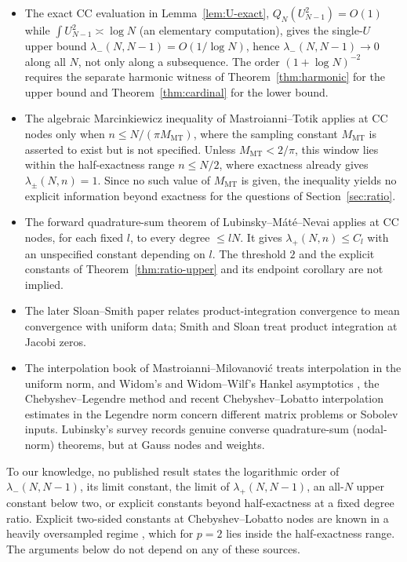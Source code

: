 \documentclass{siamart251216}
\newcommand{\Pn}{\Pi}
\begin{document}
\begin{itemize}
covers the CC nodes for even $N$ on $\Pn_N$. For Lebesgue measure and $p=2$
its $A_2$ hypothesis fails exactly at the power-weight endpoint, and the
paper states no rate for the lower constant; its forward theorem gives
boundedness of the upper constant, as does \cite{LIT-050}.
\item The exact CC evaluation in Lemma~\ref{lem:U-exact},
$Q_N(U_{N-1}^2)=O(1)$ while $\int U_{N-1}^2\asymp\log N$ (an elementary
computation), gives the single-$U$ upper bound
$\lambda_-(N,N-1)=O(1/\log N)$, hence $\lambda_-(N,N-1)\to0$ along all $N$,
not only along a subsequence. The order
$(1+\log N)^{-2}$ requires the separate harmonic witness of
Theorem~\ref{thm:harmonic} for the upper bound and Theorem~\ref{thm:cardinal}
for the lower bound.
\item The algebraic Marcinkiewicz inequality of Mastroianni--Totik
\cite{LIT-051} applies at CC nodes only when $n\le N/(\pi M_{\mathrm{MT}})$, where the
sampling constant $M_{\mathrm{MT}}$ is asserted to exist but is not specified.
Unless $M_{\mathrm{MT}}<2/\pi$, this window lies within the half-exactness
range $n\le N/2$, where exactness already gives $\lambda_\pm(N,n)=1$. Since no
such value of $M_{\mathrm{MT}}$ is given, the inequality yields no explicit
information beyond exactness for the questions of Section~\ref{sec:ratio}.
\item The forward quadrature-sum theorem of Lubinsky--M\'at\'e--Nevai
\cite{LIT-050} applies at CC nodes, for each fixed $l$, to every degree
$\le lN$. It gives $\lambda_+(N,n)\le C_l$ with an unspecified constant
depending on $l$. The threshold
$2$ and the explicit constants of Theorem~\ref{thm:ratio-upper} and its
endpoint corollary are not implied.
\item The later Sloan--Smith paper \cite{LIT-297} relates
product-integration convergence to mean convergence with uniform data;
Smith and Sloan \cite{LIT-298} treat product integration at Jacobi zeros.
\item The interpolation book of Mastroianni--Milovanovi\'c
\cite[Chap.~4]{LIT-049} treats interpolation in the uniform norm, and Widom's and
Widom--Wilf's Hankel asymptotics \cite{LIT-053,LIT-054}, the
Chebyshev--Legendre method \cite{LIT-058} and recent Chebyshev--Lobatto
interpolation estimates in the Legendre norm \cite{LIT-295} concern
different matrix problems or Sobolev inputs. Lubinsky's survey \cite{LIT-052} records genuine converse
quadrature-sum (nodal-norm) theorems, but at Gauss nodes and weights.
\end{itemize}
To our knowledge, no published result states the logarithmic order of
$\lambda_-(N,N-1)$, its limit constant, the limit of $\lambda_+(N,N-1)$, an
all-$N$ upper constant below two, or explicit constants beyond
half-exactness at a fixed degree ratio. Explicit two-sided constants at
Chebyshev--Lobatto nodes are known in a heavily oversampled regime
\cite{LIT-490}, which for $p=2$ lies inside the half-exactness range. The
arguments below do not depend on any of these sources.
\end{document}
